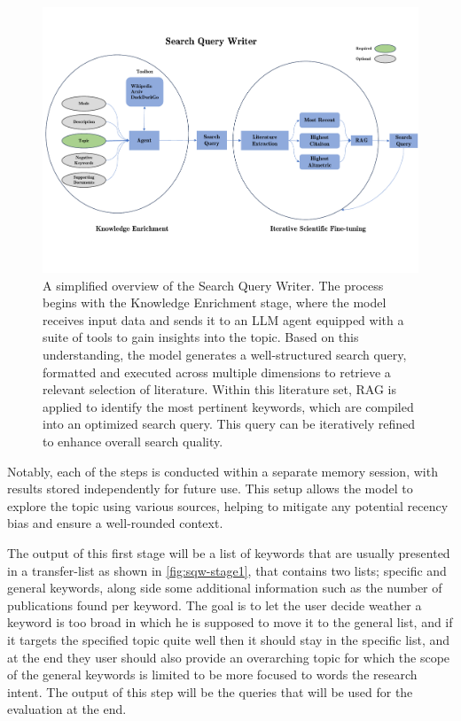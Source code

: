 \begin{figure}
	\centering
	\includegraphics[scale=0.3]{pics/sqw-overview.pdf}
	\caption[Search Query Writer]{A simplified overview of the Search Query Writer. The process begins with the Knowledge Enrichment stage, where the model receives input data and sends it to an LLM agent equipped with a suite of tools to gain insights into the topic. Based on this understanding, the model generates a well-structured search query, formatted and executed across multiple dimensions to retrieve a relevant selection of literature. Within this literature set, RAG is applied to identify the most pertinent keywords, which are compiled into an optimized search query. This query can be iteratively refined to enhance overall search quality.}
	\label{fig:sqw-overview}
\end{figure}

Notably, each of the steps is conducted within a separate memory session, with results stored independently for future use. This setup allows the model to explore the topic using various sources, helping to mitigate any potential recency bias and ensure a well-rounded context.

The output of this first stage will be a list of keywords that are usually presented in a transfer-list as shown in \autoref{fig:sqw-stage1}, that contains two lists; specific and general keywords, along side some additional information such as the number of publications found per keyword. The goal is to let the user decide weather a keyword is too broad in which he is supposed to move it to the general list, and if it targets the specified topic quite well then it should stay in the specific list, and at the end they user should also provide an overarching topic for which the scope of the general keywords is limited to be more focused to words the research intent. The output of this step will be the queries that will be used for the evaluation at the end.

